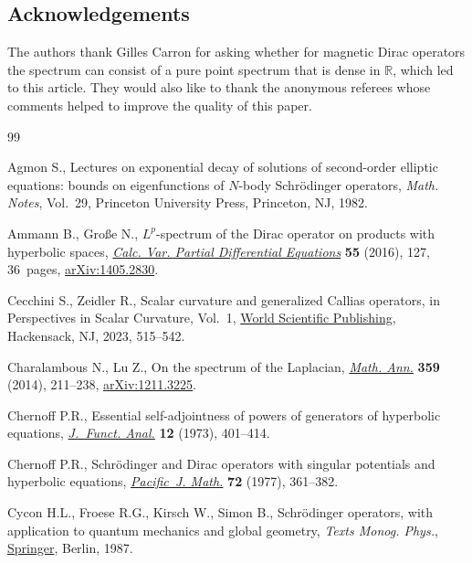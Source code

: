 \documentclass[10pt,a4paper]{amsart}
\numberwithin{equation}{section}
\begin{document}
\subsection*{Acknowledgements} The authors thank Gilles Carron for asking whether for magnetic Dirac operators the spectrum can consist of a pure point spectrum that is dense in ${\mathbb R}$, which led to this article. They would also like to thank the anonymous referees whose comments helped to improve the quality of this paper.

\begin{thebibliography}{99}
\footnotesize\itemsep=0pt

Agmon S., Lectures on exponential decay of solutions of second-order elliptic
 equations: bounds on eigenfunctions of {$N$}-body {S}chr\"odinger operators,
 \textit{Math. Notes}, Vol.~29, Princeton University Press, Princeton, NJ,
 1982.

Ammann B., Gro{\ss}e N., {$L^p$}-spectrum of the {D}irac operator on products
 with hyperbolic spaces, \href{https://doi.org/10.1007/s00526-016-1046-z}{\textit{Calc. Var. Partial Differential Equations}}
 \textbf{55} (2016), 127, 36~pages, \href{https://arxiv.org/abs/1405.2830}{arXiv:1405.2830}.

Cecchini S., Zeidler R., Scalar curvature and generalized {C}allias operators,
 in Perspectives in {S}calar {C}urvature, Vol.~1, \href{https://doi.org/10.1142/9789811273223_0002}{World Scientific Publishing},
 Hackensack, NJ, 2023, 515--542.

Charalambous N., Lu Z., On the spectrum of the {L}aplacian, \href{https://doi.org/10.1007/s00208-013-1000-8}{\textit{Math. Ann.}}
 \textbf{359} (2014), 211--238, \href{https://arxiv.org/abs/1211.3225}{arXiv:1211.3225}.

Chernoff P.R., Essential self-adjointness of powers of generators of hyperbolic
 equations, \href{https://doi.org/10.1016/0022-1236(73)90003-7}{\textit{J.~Funct. Anal.}} \textbf{12} (1973), 401--414.

Chernoff P.R., Schr\"odinger and {D}irac operators with singular potentials and
 hyperbolic equations, \href{https://doi.org/10.2140/pjm.1977.72.361}{\textit{Pacific~J. Math.}} \textbf{72} (1977), 361--382.

Cycon H.L., Froese R.G., Kirsch W., Simon B., Schr\"odinger operators, with
 application to quantum mechanics and global geometry, \textit{Texts Monog. Phys.},
 \href{https://doi.org/10.1007/978-3-540-77522-5}{Springer}, Berlin, 1987.


\end{thebibliography}
\end{document}
